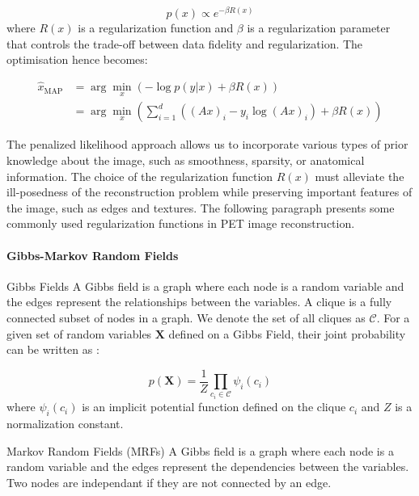 \begin{equation}
    p(x) \propto e^{-\beta R(x)}
\end{equation}
where $R(x)$ is a regularization function and $\beta$ is a regularization parameter that controls the trade-off between data fidelity and regularization. The optimisation hence becomes:

\begin{align}
    \hat{x}_{\text{MAP}} &= \arg \min_{x} \left( -\log p(y|x) + \beta R(x) \right) \\
    &= \arg \min_{x} \left( \sum_{i=1}^{d} \left( (Ax)_i - y_i \log (Ax)_i\right) + \beta R(x) \right)
    \label{eq:map_estimation}
\end{align}

The penalized likelihood approach allows us to incorporate various types of prior knowledge about the image, such as smoothness, sparsity, or anatomical information.
The choice of the regularization function $R(x)$ must alleviate the ill-posedness of the reconstruction problem while preserving important features of the image, such as edges and textures.
The following paragraph presents some commonly used regularization functions in PET image reconstruction.

\paragraph{Gibbs-Markov Random Fields}

\begin{definition}{Gibbs Fields}
A Gibbs field is a graph where each node is a random variable and the edges represent the relationships between the variables.
A clique is a fully connected subset of nodes in a graph. We denote the set of all cliques as $\mathcal{C}$.
For a given set of random variables $\mathbf{X}$ defined on a Gibbs Field, their joint probability can be written as :

\begin{equation}
    p(\mathbf{X}) = \frac{1}{Z} \prod_{c_i \in \mathcal{C}} \psi_i(c_i)
\end{equation}
where $\psi_i(c_i)$ is an implicit potential function defined on the clique $c_i$ and $Z$ is a normalization constant.
\end{definition}


\begin{definition}{Markov Random Fields (MRFs)}
    A Gibbs field is a graph where each node is a random variable and the edges represent the dependencies between the variables. Two nodes are independant if they are not connected by an edge.
\end{definition}


